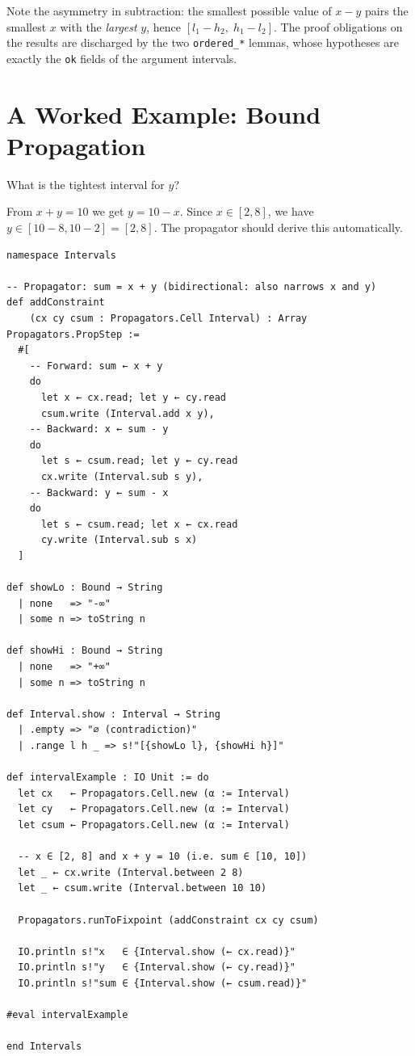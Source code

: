 \documentclass[12pt, a4paper, openright]{book}
\theoremstyle{thmstyle}
\theoremstyle{defstyle}
\newcommand{\lc}[1]{\texttt{#1}}
\newenvironment{exbox}[1][]{%
  \begin{tcolorbox}[exbox, title={Example\ifx\\#1\\\else\ --- #1\fi}]%
}{\end{tcolorbox}}
\begin{document}
Note the asymmetry in subtraction: the smallest possible value of $x - y$
pairs the smallest $x$ with the \emph{largest} $y$, hence
$[l_1 - h_2,\; h_1 - l_2]$. The proof obligations on the results are
discharged by the two \lc{ordered\_*} lemmas, whose hypotheses are exactly
the \lc{ok} fields of the argument intervals.

\section{A Worked Example: Bound Propagation}

\begin{exbox}[{$x + y = 10$, $x \in [2, 8]$}]
  What is the tightest interval for $y$?

  From $x + y = 10$ we get $y = 10 - x$. Since $x \in [2, 8]$, we have
  $y \in [10 - 8, 10 - 2] = [2, 8]$. The propagator should derive this
  automatically.
\end{exbox}

\begin{verbatim}
namespace Intervals

-- Propagator: sum = x + y (bidirectional: also narrows x and y)
def addConstraint
    (cx cy csum : Propagators.Cell Interval) : Array Propagators.PropStep :=
  #[
    -- Forward: sum ← x + y
    do
      let x ← cx.read; let y ← cy.read
      csum.write (Interval.add x y),
    -- Backward: x ← sum - y
    do
      let s ← csum.read; let y ← cy.read
      cx.write (Interval.sub s y),
    -- Backward: y ← sum - x
    do
      let s ← csum.read; let x ← cx.read
      cy.write (Interval.sub s x)
  ]

def showLo : Bound → String
  | none   => "-∞"
  | some n => toString n

def showHi : Bound → String
  | none   => "+∞"
  | some n => toString n

def Interval.show : Interval → String
  | .empty => "∅ (contradiction)"
  | .range l h _ => s!"[{showLo l}, {showHi h}]"

def intervalExample : IO Unit := do
  let cx   ← Propagators.Cell.new (α := Interval)
  let cy   ← Propagators.Cell.new (α := Interval)
  let csum ← Propagators.Cell.new (α := Interval)

  -- x ∈ [2, 8] and x + y = 10 (i.e. sum ∈ [10, 10])
  let _ ← cx.write (Interval.between 2 8)
  let _ ← csum.write (Interval.between 10 10)

  Propagators.runToFixpoint (addConstraint cx cy csum)

  IO.println s!"x   ∈ {Interval.show (← cx.read)}"
  IO.println s!"y   ∈ {Interval.show (← cy.read)}"
  IO.println s!"sum ∈ {Interval.show (← csum.read)}"

#eval intervalExample

end Intervals
\end{verbatim}
\end{document}
